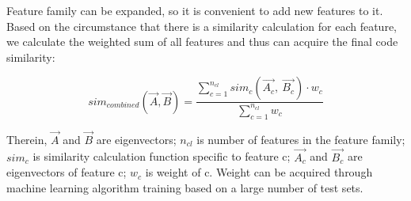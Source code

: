 Feature family can be expanded, so it is convenient to add new features to it. Based on the circumstance that there is a similarity calculation for each feature, we calculate the weighted sum of all features and thus can acquire the final code similarity:


\begin{equation}
	sim_{combined}(\vec{A}, \vec{B})=\frac{\sum_{c=1}^{n_{cl}}sim_{c}(\vec{A_c},~\vec{B_c})\cdot w_{c}}{\sum_{c=1}^{n_{cl}}w_{c}}
\end{equation}

Therein, $\vec{A}$ and $\vec{B}$ are eigenvectors; $n_{cl}$ is number of features in the feature family; $sim_{c}$ is similarity calculation function specific to feature c; $\vec{A_c}$ and $\vec{B_c}$ are eigenvectors of feature c; $w_{c}$ is weight of c. Weight can be acquired through machine learning algorithm training based on a large number of test sets.

